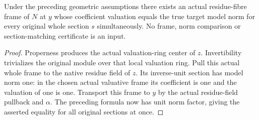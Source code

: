 \begin{theorem}\label{thm:proper-model-norm-source-frame-existence}
\leanok
Under the preceding geometric assumptions there exists an actual
residue-fibre frame of $N$ at $y$ whose coefficient valuation equals
the true target model norm for every original whole section $s$
simultaneously. No frame, norm comparison or section-matching
certificate is an input.
\end{theorem}
\begin{proof}
Properness produces the actual valuation-ring center of $z$.
Invertibility trivializes the original module over that local
valuation ring. Pull this actual whole frame to the native residue
field of $z$. Its inverse-unit section has model norm one: in the
chosen actual valuative frame its coefficient is one and the
valuation of one is one. Transport this frame to $y$ by the actual
residue-field pullback and $\alpha$. The preceding formula now has
unit norm factor, giving the asserted equality for all original
sections at once.
\end{proof}
